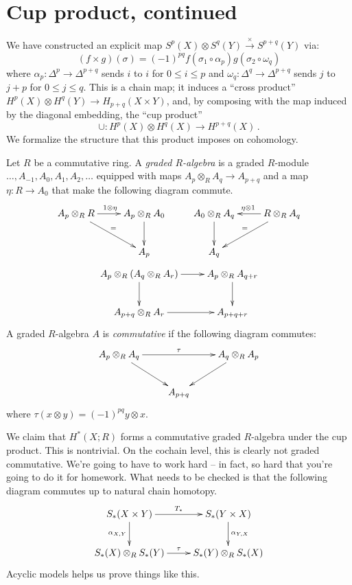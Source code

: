 \section{Cup product, continued}
We have constructed an explicit map $S^p(X)\otimes S^q(Y)\xrightarrow{\times} S^{p+q}(Y)$ via:
\begin{equation*}
(f\times g)(\sigma)=(-1)^{pq}f(\sigma_1\circ\alpha_p)g(\sigma_2\circ\omega_q)
\end{equation*}
where $\alpha_p:\Delta^p\to\Delta^{p+q}$ sends $i$ to $i$ for 
$0\leq i\leq p$ and $\omega_q:\Delta^q\to\Delta^{p+q}$ sends $j$ to $j+p$ 
for  $0\leq j\leq q$. This is a chain map; it induces a ``cross product''
$ H^p(X)\otimes H^q(Y)\to H_{p+q}(X\times Y)$, and, by composing with the
map induced by the diagonal embedding, the ``cup product''
\[
\cup:H^p(X)\otimes H^q(X)\to H^{p+q}(X)\,.
\]
We formalize the structure that this product imposes on cohomology.
\begin{definition}
Let $R$ be a commutative ring. A \emph{graded $R$-algebra} is a graded $R$-module $\ldots,A_{-1},A_0, A_1,A_2,\ldots$ equipped with maps $A_p\otimes_R A_q\to A_{p+q}$ and a map $\eta:R\to A_0$ that make the following diagram commute.
\[
\xymatrix{
A_p\otimes_R R \ar[r]^{1\otimes\eta} \ar[dr]^= &A_p\otimes_R A_0 \ar[d] &
A_0\otimes_R A_q \ar[d] & R\otimes_R A_q \ar[l]_{\eta\otimes1} \ar[dl]_= \\
& A_p & A_q 
}\]
\begin{equation*}
\xymatrix{
A_p\otimes_R (A_q\otimes_R A_r)\ar[r]\ar[d] & A_p\otimes_R A_{q+r}\ar[d]\\
A_{p+q}\otimes_R A_r \ar[r] & A_{p+q+r}
}
\end{equation*}
A graded $R$-algebra $A$ is {\em commutative} if the following diagram commutes:
\begin{equation*}
\xymatrix{
	A_p\otimes_R A_q\ar[rr]^{\tau}\ar[dr] & & A_q\otimes_R A_p \ar[dl]\\
	 & A_{p+q} & 
}
\end{equation*}
where $\tau(x\otimes y)=(-1)^{pq}y\otimes x$. 
\end{definition}
We claim that $ H^\ast(X;R)$ forms a commutative graded $R$-algebra under the cup product. This is nontrivial. On the cochain level, this is clearly not graded commutative. We're going to have to work hard -- in fact, so hard that you're going to do it for homework. What needs to be checked is that the following 
diagram commutes up to natural chain homotopy.
\begin{equation*}
\xymatrix{S_\ast(X\times Y)\ar[r]^{T_\ast}\ar[d]_{\alpha_{X,Y}} & S_\ast(Y\times X)\ar[d]^{\alpha_{Y,X}}\\
S_\ast(X)\otimes_R S_\ast(Y)\ar[r]^{\tau} & S_\ast(Y)\otimes_R S_\ast(X)}
\end{equation*}
Acyclic models helps us prove things like this.

